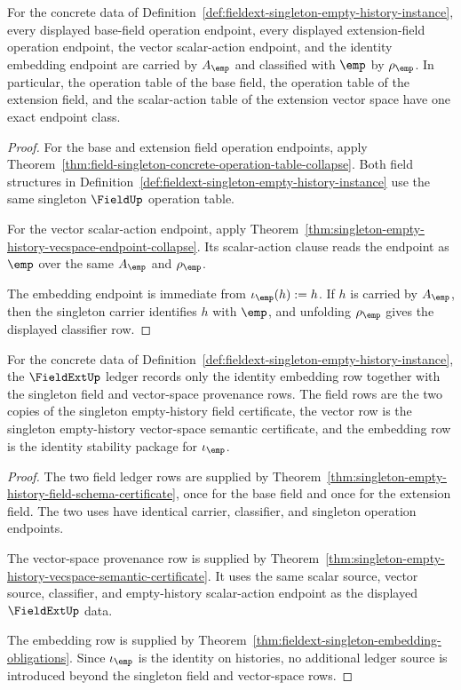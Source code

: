 \begin{theorem}
\label{thm:fieldext-singleton-exact-endpoint-classification}
For the concrete data of
Definition~\ref{def:fieldext-singleton-empty-history-instance}, every displayed
base-field operation endpoint, every displayed extension-field operation
endpoint, the vector scalar-action endpoint, and the identity embedding
endpoint are carried by $A_{\emp}$ and classified with $\emp$ by
$\rho_{\emp}$. In particular, the operation table of the base field, the
operation table of the extension field, and the scalar-action table of the
extension vector space have one exact endpoint class.
\end{theorem}
\begin{proof}
For the base and extension field operation endpoints, apply
Theorem~\ref{thm:field-singleton-concrete-operation-table-collapse}. Both
field structures in
Definition~\ref{def:fieldext-singleton-empty-history-instance} use the same
singleton $\FieldUp$ operation table.

For the vector scalar-action endpoint, apply
Theorem~\ref{thm:singleton-empty-history-vecspace-endpoint-collapse}. Its
scalar-action clause reads the endpoint as $\emp$ over the same
$A_{\emp}$ and $\rho_{\emp}$.

The embedding endpoint is immediate from $\iota_{\emp}(h):=h$. If $h$ is
carried by $A_{\emp}$, then the singleton carrier identifies $h$ with
$\emp$, and unfolding $\rho_{\emp}$ gives the displayed classifier row.
\end{proof}

\begin{theorem}
\label{thm:fieldext-singleton-ledger-provenance}
For the concrete data of
Definition~\ref{def:fieldext-singleton-empty-history-instance}, the
$\FieldExtUp$ ledger records only the identity embedding row together with
the singleton field and vector-space provenance rows. The field rows are the
two copies of the singleton empty-history field certificate, the vector row is
the singleton empty-history vector-space semantic certificate, and the
embedding row is the identity stability package for $\iota_{\emp}$.
\end{theorem}
\begin{proof}
The two field ledger rows are supplied by
Theorem~\ref{thm:singleton-empty-history-field-schema-certificate}, once for
the base field and once for the extension field. The two uses have identical
carrier, classifier, and singleton operation endpoints.

The vector-space provenance row is supplied by
Theorem~\ref{thm:singleton-empty-history-vecspace-semantic-certificate}. It
uses the same scalar source, vector source, classifier, and empty-history
scalar-action endpoint as the displayed $\FieldExtUp$ data.

The embedding row is supplied by
Theorem~\ref{thm:fieldext-singleton-embedding-obligations}. Since
$\iota_{\emp}$ is the identity on histories, no additional ledger source is
introduced beyond the singleton field and vector-space rows.
\end{proof}

